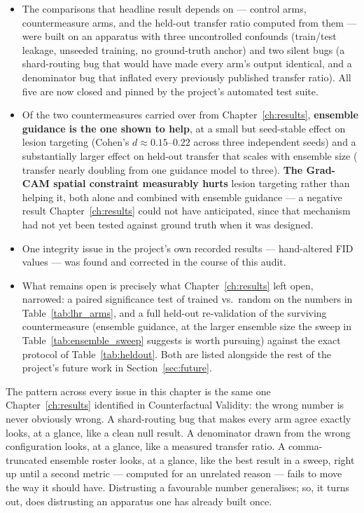 \begin{itemize}[leftmargin=*]
  \item The comparisons that headline result depends on --- control arms,
        countermeasure arms, and the held-out transfer ratio computed from
        them --- were built on an apparatus with three uncontrolled
        confounds (train/test leakage, unseeded training, no ground-truth
        anchor) and two silent bugs (a shard-routing bug that would have
        made every arm's output identical, and a denominator bug that
        inflated every previously published transfer ratio). All five are
        now closed and pinned by the project's automated test suite.
  \item Of the two countermeasures carried over from Chapter~\ref{ch:results},
        \textbf{ensemble guidance is the one shown to help}, at a small
        but seed-stable effect on lesion targeting (Cohen's $d \approx
        0.15$--$0.22$ across three independent seeds) and a substantially
        larger effect on held-out transfer that scales with ensemble size
        (\pton{} transfer nearly doubling from one guidance model to
        three). \textbf{The Grad-CAM spatial constraint measurably hurts}
        lesion targeting rather than helping it, both alone and combined
        with ensemble guidance --- a negative result Chapter~\ref{ch:results}
        could not have anticipated, since that mechanism had not yet been
        tested against ground truth when it was designed.
  \item One integrity issue in the project's own recorded results ---
        hand-altered FID values --- was found and corrected in the course
        of this audit.
  \item What remains open is precisely what Chapter~\ref{ch:results} left
        open, narrowed: a paired significance test of trained vs.\ random
        on the numbers in Table~\ref{tab:lhr_arms}, and a full held-out
        re-validation of the surviving countermeasure (ensemble guidance,
        at the larger ensemble size the sweep in
        Table~\ref{tab:ensemble_sweep} suggests is worth pursuing) against
        the exact protocol of Table~\ref{tab:heldout}. Both are listed
        alongside the rest of the project's future work in
        Section~\ref{sec:future}.
\end{itemize}

The pattern across every issue in this chapter is the same one
Chapter~\ref{ch:results} identified in Counterfactual Validity: the wrong
number is never obviously wrong. A shard-routing bug that makes every arm
agree exactly looks, at a glance, like a clean null result. A denominator
drawn from the wrong configuration looks, at a glance, like a measured
transfer ratio. A comma-truncated ensemble roster looks, at a glance, like
the best result in a sweep, right up until a second metric --- computed for
an unrelated reason --- fails to move the way it should have. Distrusting a
favourable number generalises; so, it turns out, does distrusting an
apparatus one has already built once.
